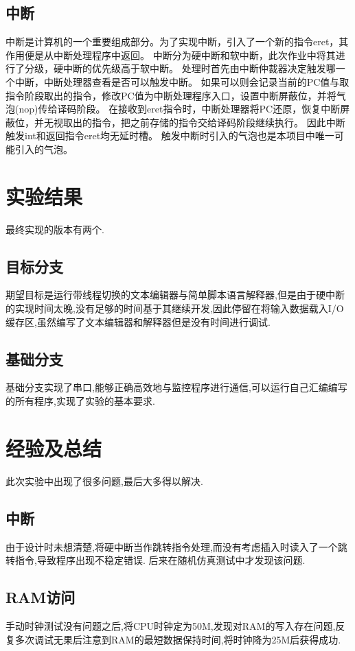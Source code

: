   \subsection{中断}
    中断是计算机的一个重要组成部分。为了实现中断，引入了一个新的指令eret，其作用便是从中断处理程序中返回。
    中断分为硬中断和软中断，此次作业中将其进行了分级，硬中断的优先级高于软中断。
    处理时首先由中断仲裁器决定触发哪一个中断，中断处理器查看是否可以触发中断。
    如果可以则会记录当前的PC值与取指令阶段取出的指令，修改PC值为中断处理程序入口，设置中断屏蔽位，并将气泡(nop)传给译码阶段。
    在接收到eret指令时，中断处理器将PC还原，恢复中断屏蔽位，并无视取出的指令，把之前存储的指令交给译码阶段继续执行。
    因此中断触发int和返回指令eret均无延时槽。
    触发中断时引入的气泡也是本项目中唯一可能引入的气泡。

\section{实验结果}
  最终实现的版本有两个.
  \subsection{目标分支}
    期望目标是运行带线程切换的文本编辑器与简单脚本语言解释器,但是由于硬中断的实现时间太晚,没有足够的时间基于其继续开发,因此停留在将输入数据载入I/O缓存区,虽然编写了文本编辑器和解释器但是没有时间进行调试.
  \subsection{基础分支}
    基础分支实现了串口,能够正确高效地与监控程序进行通信,可以运行自己汇编编写的所有程序,实现了实验的基本要求.

\section{经验及总结}
  此次实验中出现了很多问题,最后大多得以解决.
  \subsection{中断}
    由于设计时未想清楚,将硬中断当作跳转指令处理,而没有考虑插入时读入了一个跳转指令,导致程序出现不稳定错误.
    后来在随机仿真测试中才发现该问题.
  \subsection{RAM访问}
    手动时钟测试没有问题之后,将CPU时钟定为50M,发现对RAM的写入存在问题,反复多次调试无果后注意到RAM的最短数据保持时间,将时钟降为25M后获得成功.
